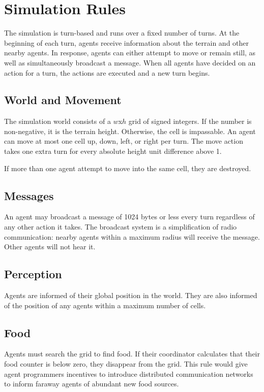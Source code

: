 \section{Simulation Rules}
\label{rules}

The simulation is turn-based and runs over a fixed number of turns. At the beginning of each turn, agents receive information about the terrain and other nearby agents. In response, agents can either attempt to move or remain still, as well as simultaneously broadcast a message. When all agents have decided on an action for a turn, the actions are executed and a new turn begins.

\subsection{World and Movement}

The simulation world consists of a $w$x$h$ grid of signed integers. If the number is non-negative, it is the terrain height. Otherwise, the cell is impassable. An agent can move at most one cell up, down, left, or right per turn. The move action takes one extra turn for every absolute height unit difference above 1.

If more than one agent attempt to move into the same cell, they are destroyed.

\subsection{Messages}

An agent may broadcast a message of 1024 bytes or less every turn regardless of any other action it takes. The broadcast system is a simplification of radio communication: nearby agents within a maximum radius will receive the message. Other agents will not hear it.

\subsection{Perception}

Agents are informed of their global position in the world. They are also informed of the position of any agents within a maximum number of cells.

\subsection{Food}

Agents must search the grid to find food. If their coordinator calculates that their food counter is below zero, they disappear from the grid. This rule would give agent programmers incentives to introduce distributed communication networks to inform faraway agents of abundant new food sources.

